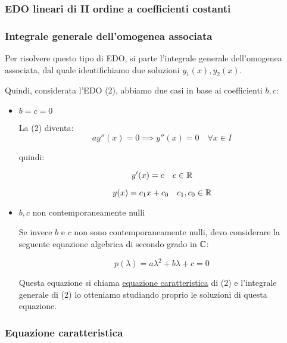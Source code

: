 \subsubsection{EDO lineari di II ordine a coefficienti costanti}



\subsubsection{Integrale generale dell'omogenea associata}

Per risolvere questo tipo di EDO, si parte l'integrale generale dell'omogenea associata, dal quale identifichiamo due soluzioni \(y_1(x), y_2(x)\).

Quindi, considerata l'EDO (2), abbiamo due casi in base ai coefficienti \(b,c\):

\begin{itemize}
    \item
          \(b=c=0\)

          La (2) diventa:
          \[
              ay''(x) = 0 \implies y''(x) = 0 \quad \forall x \in I
          \]

          quindi:

          \[
              y'(x) = c \quad c \in \mathbb{R}
          \]

          \[
              y(x) = c_1x+c_0 \quad c_1,c_0 \in \mathbb{R}
          \]
    \item
          \(b,c\) non contemporaneamente nulli

          Se invece \(b\) e \(c\) non sono contemporaneamente nulli, devo considerare la seguente equazione algebrica di secondo grado in \(\mathbb{C} \):

          \[
              p(\lambda) = a \lambda^{2}+b \lambda + c =0
          \]

          Questa equazione si chiama \underline{equazione caratteristica} di (2) e l'integrale generale di (2) lo otteniamo studiando proprio le soluzioni di questa equazione.
\end{itemize}

\subsubsection*{Equazione caratteristica}


